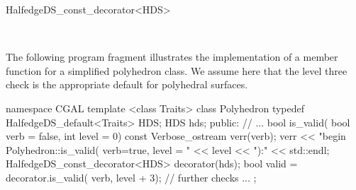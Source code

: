 \begin{ccRefClass}{HalfedgeDS_const_decorator<HDS>}



\ccSeeAlso

\\

\ccExample

The following program fragment illustrates the implementation of a
 member function for a simplified polyhedron class.
We assume here that the level three check is the appropriate default
for polyhedral surfaces.

\begin{ccExampleCode}
namespace CGAL {
    template <class Traits>
    class Polyhedron {
	typedef HalfedgeDS_default<Traits> HDS;
	HDS hds;
    public:
	// ...
	bool is_valid( bool verb = false, int level = 0) const {
	    Verbose_ostream verr(verb);
	    verr << "begin Polyhedron::is_valid( verb=true, level = " << level 
		 << "):" << std::endl;
	    HalfedgeDS_const_decorator<HDS> decorator(hds);
	    bool valid = decorator.is_valid( verb, level + 3);
	    // further checks ...
	}
    };
}
\end{ccExampleCode}

\end{ccRefClass}

\ccRefPageEnd
